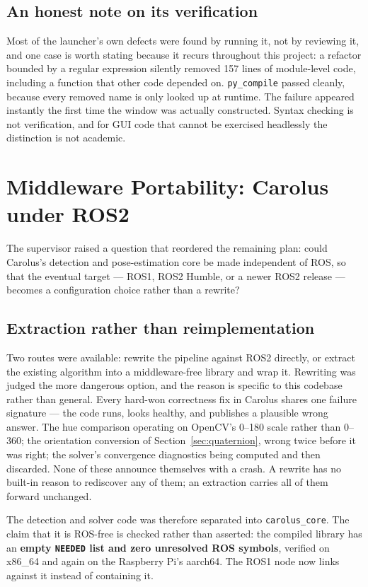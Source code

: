 \documentclass[11pt]{article}
\begin{document}
\subsection{An honest note on its verification}

Most of the launcher's own defects were found by running it, not by
reviewing it, and one case is worth stating because it recurs throughout
this project: a refactor bounded by a regular expression silently removed
157 lines of module-level code, including a function that other code
depended on. \texttt{py\_compile} passed cleanly, because every removed name
is only looked up at runtime. The failure appeared instantly the first time
the window was actually constructed. Syntax checking is not verification,
and for GUI code that cannot be exercised headlessly the distinction is not
academic.

\section{Middleware Portability: Carolus under ROS2}
\label{sec:ros2}

The supervisor raised a question that reordered the remaining plan: could
Carolus's detection and pose-estimation core be made independent of ROS, so
that the eventual target --- ROS1, ROS2 Humble, or a newer ROS2 release ---
becomes a configuration choice rather than a rewrite?

\subsection{Extraction rather than reimplementation}

Two routes were available: rewrite the pipeline against ROS2 directly, or
extract the existing algorithm into a middleware-free library and wrap it.
Rewriting was judged the more dangerous option, and the reason is specific to
this codebase rather than general. Every hard-won correctness fix in Carolus
shares one failure signature --- the code runs, looks healthy, and publishes
a plausible wrong answer. The hue comparison operating on OpenCV's 0--180
scale rather than 0--360; the orientation conversion of
Section~\ref{sec:quaternion}, wrong twice before it was right; the solver's
convergence diagnostics being computed and then discarded. None of these
announce themselves with a crash. A rewrite has no built-in reason to
rediscover any of them; an extraction carries all of them forward unchanged.

The detection and solver code was therefore separated into
\texttt{carolus\_core}. The claim that it is ROS-free is checked rather than
asserted: the compiled library has an \textbf{empty \texttt{NEEDED} list and
zero unresolved ROS symbols}, verified on x86\_64 and again on the Raspberry
Pi's aarch64. The ROS1 node now links against it instead of containing it.
\end{document}
